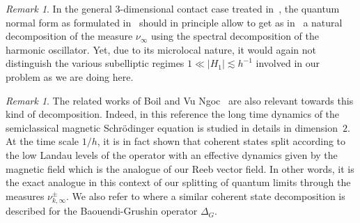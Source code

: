 \documentclass[JEP,XML,SOM,Unicode, NoEqCountersInSection,published]{cedram}
\theoremstyle{plain}
\theoremstyle{definition}
\theoremstyle{remark}
\newtheorem{rema}[theo]{Remark}
\begin{document}
\begin{rema}
In the general $3$-dimensional contact case treated in~\cite{ColindeVerdiereHillairetTrelat15}, the quantum normal form as formulated in~\cite[\S6.2]{ColindeVerdiere2023} should in principle allow to get as in~\cite{FermanianFischer21} a natural decomposition of the measure $\nu_\infty$ using the spectral decomposition of the harmonic oscillator. Yet, due to its microlocal nature, it would again not distinguish the various subelliptic regimes $1\ll |H_1|\lesssim h^{-1}$ involved in our problem as we are doing here.
\end{rema}
\begin{rema} The related works of Boil and Vu Ngoc~\cite{BoilVuNgoc21} are also relevant towards this kind of decomposition. Indeed, in this reference the long time dynamics of the semiclassical magnetic Schrödinger equation is studied in details in dimension~$2$. At the time scale $1/h$, it is in fact shown that coherent states split according to the low Landau levels of the operator with an effective dynamics given by the magnetic field which is the analogue of our Reeb vector field. In other words, it is the exact analogue in this context of our splitting of quantum limits through the measures $\nu_{k,\infty}^\pm$. We also refer to \cite[\S5]{ArnaizSun22} where a similar coherent state decomposition is described for the Baouendi-Grushin operator $\Delta_G$.
\end{rema}
\end{document}
